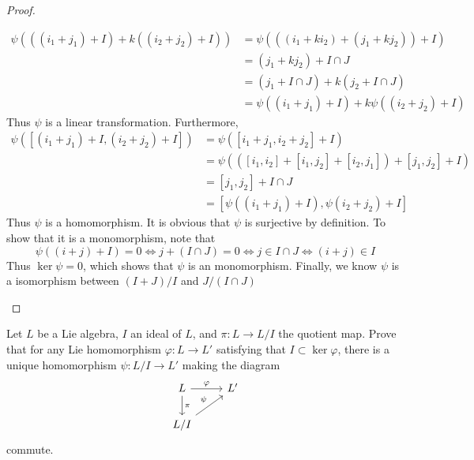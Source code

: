 \documentclass[../main.tex]{subfiles}
\begin{document}
\begin{proof}
\begin{enumerate}
\[          \begin{aligned}
          \psi \left( \left( \left( i_1+ j_1 \right)+ I \right)+ k\left( \left( i_2+ j_2 \right)+ I  \right)   \right)  &= \psi \left( \left( \left( i_1+ ki_2 \right)+ \left( j_1+k j_2 \right)   \right)+ I \right)\\ 
           &= \left( j_1+kj_2 \right)+ I\cap J\\ 
            &= \left( j_1+ I\cap J \right)+k \left( j_2+ I\cap J \right)\\ 
             &= \psi \left( \left( i_1+ j_1 \right)+ I  \right)+ k\psi \left( \left( i_2+ j_2 \right)+ I  \right)      
          \end{aligned}
          \]Thus \(  \psi   \) is a linear transformation. Furthermore, \[
          \begin{aligned}
          \psi \left( [\left( i_1+ j_1 \right)+ I, \left( i_2+ j_2 \right) +  I ] \right)&=   \psi \left( [i_1+ j_1,i_2+ j_2]+ I \right)\\ 
           &= \psi \left( \left( [i_1,i_2]+ [i_1,j_2]+ [i_2,j_1] \right)+ [j_1,j_2]+ I  \right)\\ 
            &= [j_1,j_2]+ I\cap J\\ 
             &= [\psi \left( \left( i_1+ j_1 \right)+ I  \right),\psi \left( i_2+ j_2 \right)+ I  ]
          \end{aligned}
          \]        Thus \(  \psi   \) is a homomorphism. It is obvious that \(  \psi   \) is surjective by definition. To show that it is a monomorphism, note that \[
          \psi \left( \left( i+ j \right)+ I  \right)= 0\iff j + \left( I\cap J \right)= 0\iff  j \in I\cap J\iff \left( i+ j \right)\in I   
          \]Thus \(  \operatorname{ker}\psi = 0  \),     which shows that \(  \psi   \) is an monomorphism. Finally, we know \(  \psi   \) is a isomorphism between \(  \left( I+ J \right)/I   \) and \(  J/\left( I\cap J \right)   \)    
     \end{enumerate}
     
\end{proof}



\begin{exercise}{}{}
Let $L$ be a Lie algebra, $I$ an ideal of $L$, and $\pi : L \to L/I$ the quotient map. Prove that for any Lie homomorphism $\varphi : L \to L'$ satisfying that $I \subset \ker \varphi$, there is a unique homomorphism $\psi: L/I \to L'$ making the diagram
\[
\begin{tikzcd}
L \arrow[r, "\varphi"] \arrow[d, "\pi"] & L' \\
L/I \arrow[ur, "\psi"] &
\end{tikzcd}
\]
commute.
\end{exercise}
\end{document}
